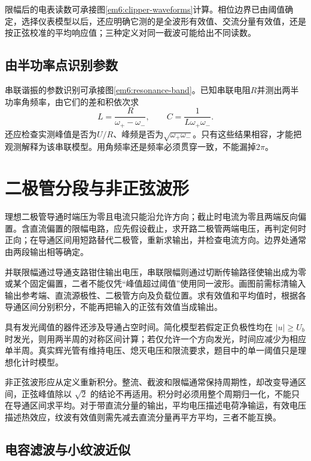 限幅后的电表读数可承接图\ref{em6:clipper-waveforms}计算。相位边界已由阈值确定，选择仪表模型以后，还应明确它测的是全波形有效值、交流分量有效值，还是按正弦校准的平均响应值；三种定义对同一截波可能给出不同读数。



\subsection{由半功率点识别参数}

串联谐振的参数识别可承接图\ref{em6:resonance-band}。已知串联电阻$R$并测出两半功率角频率，由它们的差和积依次求
\[
 L=\frac{R}{\omega_+-\omega_-},\qquad
 C=\frac{1}{L\omega_+\omega_-}.
\]
还应检查实测峰值是否为$U/R$、峰频是否为$\sqrt{\omega_+\omega_-}$。只有这些结果相容，才能把观测解释为该串联模型。用角频率还是频率必须贯穿一致，不能漏掉$2\pi$。


\section{二极管分段与非正弦波形}

理想二极管导通时端压为零且电流只能沿允许方向；截止时电流为零且两端反向偏置。含直流偏置的限幅电路，应先假设截止，求开路二极管两端电压，再判定何时正向；在导通区间用短路替代二极管，重新求输出，并检查电流方向。边界处通常由两段输出相等确定。

并联限幅通过导通支路钳住输出电压，串联限幅则通过切断传输路径使输出成为零或某个固定偏置，二者不能仅凭“峰值超过阈值”使用同一波形。画图前需标清输入输出参考端、直流源极性、二极管方向及负载位置。求有效值和平均值时，根据各导通区间分别积分，不能再把输入的正弦有效值当成输出。



具有发光阈值的器件还涉及导通占空时间。简化模型若假定正负极性均在 $|u|\ge U_b$ 时发光，则用两半周的对称区间计算；若仅允许一个方向发光，时间应减少为相应单半周。真实辉光管有维持电压、熄灭电压和限流要求，题目中的单一阈值只是理想化计时模型。



非正弦波形应从定义重新积分。整流、截波和限幅通常保持周期性，却改变导通区间，正弦峰值除以 $\sqrt2$ 的结论不再适用。积分时必须用整个周期归一化，不能只在导通区间求平均。对于带直流分量的输出，平均电压描述电荷净输运，有效电压描述热效应，纹波有效值则需先减去直流分量再平方平均，三者不能互换。

\subsection{电容滤波与小纹波近似}

